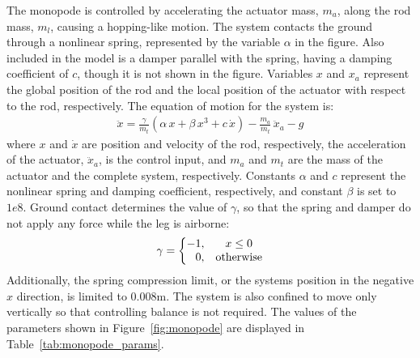The monopode is controlled by accelerating the actuator mass, $m_a$, along the rod mass, $m_l$, causing a hopping-like motion. The system contacts the ground through a nonlinear spring, represented by the variable $\alpha$ in the figure. Also included in the model is a damper parallel with the spring, having a damping coefficient of $c$, though it is not shown in the figure. Variables $x$ and $x_a$ represent the global position of the rod and the local position of the actuator with respect to the rod, respectively. The equation of motion for the system is: 
% 
\begin{equation}
    \label{eq:eom}
    \begin{aligned}
        \ddot{x} = \frac{\gamma}{m_t} \left(\alpha\,x + \beta\,x^3 + c\,\dot{x}\right)-\frac{m_a}{m_t}\,\ddot{x}_a-g 
    \end{aligned}
\end{equation}
%
where $x$ and $\dot{x}$ are position and velocity of the rod, respectively, the acceleration of the actuator, $\ddot{x}_a$, is the control input, and $m_a$ and $m_t$ are the mass of the actuator and the complete system, respectively. Constants $\alpha$ and $c$ represent the nonlinear spring and damping coefficient, respectively, and constant $\beta$ is set to $1e8$. Ground contact determines the value of $\gamma$, so that the spring and damper do not apply any force while the leg is airborne:
% 
\begin{equation}
    \label{eq:gamaa}
    \gamma =
    \left\{\begin{matrix}
        -1, & x \leq 0\\ 
        \hphantom{-} 0, & \mbox{otherwise}
    \end{matrix}\right.
\end{equation}  
% 
Additionally, the spring compression limit, or the systems position in the negative $x$ direction, is limited to 0.008m. The system is also confined to move only vertically so that controlling balance is not required. The values of the parameters shown in Figure~\ref{fig:monopode} are displayed in Table~\ref{tab:monopode_params}. 
% 
